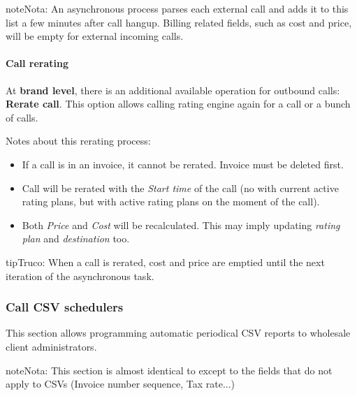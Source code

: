 \documentclass[letterpaper,10pt,spanish]{sphinxmanual}
\begin{document}
\begin{notice}{note}{Nota:}
An asynchronous process parses each external call and adds it to this list a few minutes after call hangup. Billing related fields, such as cost and price, will be empty for external incoming calls.
\end{notice}


\paragraph{Call rerating}
\label{administration_portal/client/wholesale/calls/external_calls:call-rerating}
At \textbf{brand level}, there is an additional available operation for outbound calls: \textbf{Rerate call}. This option allows calling rating engine again for a call or a bunch of calls.

Notes about this rerating process:
\begin{itemize}
\item {} 
If a call is in an invoice, it cannot be rerated. Invoice must be deleted first.

\item {} 
Call will be rerated with the \emph{Start time} of the call (no with current active rating plans, but with active rating plans
on the moment of the call).

\item {} 
Both \emph{Price} and \emph{Cost} will be recalculated. This may imply updating \emph{rating plan} and \emph{destination} too.

\end{itemize}

\begin{notice}{tip}{Truco:}
When a call is rerated, cost and price are emptied until the next iteration of the asynchronous task.
\end{notice}


\subsubsection{Call CSV schedulers}
\label{administration_portal/client/wholesale/calls/call_csv_schedulers:call-csv-schedulers}\label{administration_portal/client/wholesale/calls/call_csv_schedulers::doc}
This section allows programming automatic periodical CSV reports to wholesale client administrators.

\begin{notice}{note}{Nota:}
This section is almost identical to {\hyperref[administration_portal/brand/invoicing/invoice_schedulers:invoice\string-schedulers]{}} except to the
fields that do not apply to CSVs (Invoice number sequence, Tax rate...)
\end{notice}
\end{document}
